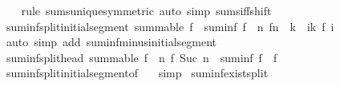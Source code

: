 \begin{isabellebody}
%
\isadelimproof
\ \ %
\endisadelimproof
%
\isatagproof
{}\isamarkupfalse%
\ {\isacharparenleft}{\kern0pt}rule\ sums{\isacharunderscore}{\kern0pt}unique{\isacharbrackleft}{\kern0pt}symmetric{\isacharbrackright}{\kern0pt}{\isacharparenright}{\kern0pt}\ {\isacharparenleft}{\kern0pt}auto\ simp{\isacharcolon}{\kern0pt}\ sums{\isacharunderscore}{\kern0pt}iff{\isacharunderscore}{\kern0pt}shift{\isacharparenright}{\kern0pt}%
\endisatagproof
{\isafoldproof}%
%
\isadelimproof
\isanewline
%
\endisadelimproof
\isanewline
{}\isamarkupfalse%
\ suminf{\isacharunderscore}{\kern0pt}split{\isacharunderscore}{\kern0pt}initial{\isacharunderscore}{\kern0pt}segment{\isacharcolon}{\kern0pt}\ {\isachardoublequoteopen}summable\ f\ {\isasymLongrightarrow}\ suminf\ f\ {\isacharequal}{\kern0pt}\ {\isacharparenleft}{\kern0pt}{\isasymSum}n{\isachardot}{\kern0pt}\ f{\isacharparenleft}{\kern0pt}n\ {\isacharplus}{\kern0pt}\ k{\isacharparenright}{\kern0pt}{\isacharparenright}{\kern0pt}\ {\isacharplus}{\kern0pt}\ {\isacharparenleft}{\kern0pt}{\isasymSum}i{\isacharless}{\kern0pt}k{\isachardot}{\kern0pt}\ f\ i{\isacharparenright}{\kern0pt}{\isachardoublequoteclose}\isanewline
%
\isadelimproof
\ \ %
\endisadelimproof
%
\isatagproof
{}\isamarkupfalse%
\ {\isacharparenleft}{\kern0pt}auto\ simp\ add{\isacharcolon}{\kern0pt}\ suminf{\isacharunderscore}{\kern0pt}minus{\isacharunderscore}{\kern0pt}initial{\isacharunderscore}{\kern0pt}segment{\isacharparenright}{\kern0pt}%
\endisatagproof
{\isafoldproof}%
%
\isadelimproof
\isanewline
%
\endisadelimproof
\isanewline
{}\isamarkupfalse%
\ suminf{\isacharunderscore}{\kern0pt}split{\isacharunderscore}{\kern0pt}head{\isacharcolon}{\kern0pt}\ {\isachardoublequoteopen}summable\ f\ {\isasymLongrightarrow}\ {\isacharparenleft}{\kern0pt}{\isasymSum}n{\isachardot}{\kern0pt}\ f\ {\isacharparenleft}{\kern0pt}Suc\ n{\isacharparenright}{\kern0pt}{\isacharparenright}{\kern0pt}\ {\isacharequal}{\kern0pt}\ suminf\ f\ {\isacharminus}{\kern0pt}\ f\ {}{\isachardoublequoteclose}\isanewline
%
\isadelimproof
\ \ %
\endisadelimproof
%
\isatagproof
{}\isamarkupfalse%
\ suminf{\isacharunderscore}{\kern0pt}split{\isacharunderscore}{\kern0pt}initial{\isacharunderscore}{\kern0pt}segment{\isacharbrackleft}{\kern0pt}of\ {}{\isacharbrackright}{\kern0pt}\ \isamarkupfalse%
\ simp%
\endisatagproof
{\isafoldproof}%
%
\isadelimproof
\isanewline
%
\endisadelimproof
\isanewline
{}\isamarkupfalse%
\ suminf{\isacharunderscore}{\kern0pt}exist{\isacharunderscore}{\kern0pt}split{\isacharcolon}{\kern0pt}\isanewline

\end{isabellebody}
